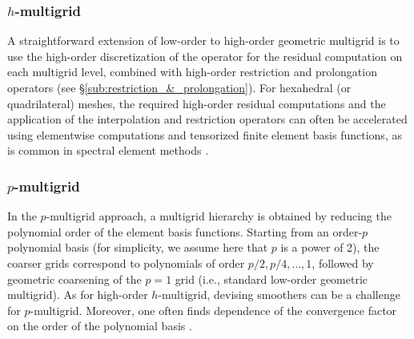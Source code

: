 \documentclass[smallcondensed,final]{svjour3}     %
\begin{document}
\subsubsection{$h$-multigrid}\label{subsec:h}
A straightforward extension of low-order to high-order geometric
multigrid is to use the high-order discretization of the operator for
the residual computation on each multigrid level, combined with
high-order restriction and prolongation operators
(see \S\ref{sub:restriction_&_prolongation}).
%
For hexahedral (or quadrilateral) meshes, the required high-order residual
computations and the application of the interpolation and restriction operators
can often be accelerated using elementwise computations and
tensorized finite element basis functions, as is common
in spectral element methods \cite{DevilleFischerMund02}.

\subsubsection{$p$-multigrid}\label{subsec:p}
In the $p$-multigrid approach, a multigrid hierarchy is obtained by reducing
the polynomial order of the element basis functions.
Starting from an order-$p$ polynomial basis (for
simplicity, we assume here that $p$ is a power of 2), the coarser
grids correspond to polynomials of order $p/2, p/4,\ldots,1$, followed
by geometric coarsening of the $p=1$ grid (i.e., standard low-order
geometric multigrid).  As for high-order $h$-multigrid, devising
smoothers can be a challenge for $p$-multigrid.  Moreover, one often
finds dependence of the convergence factor on the order of the
polynomial basis \cite{MadayMunoz89}.
\end{document}
